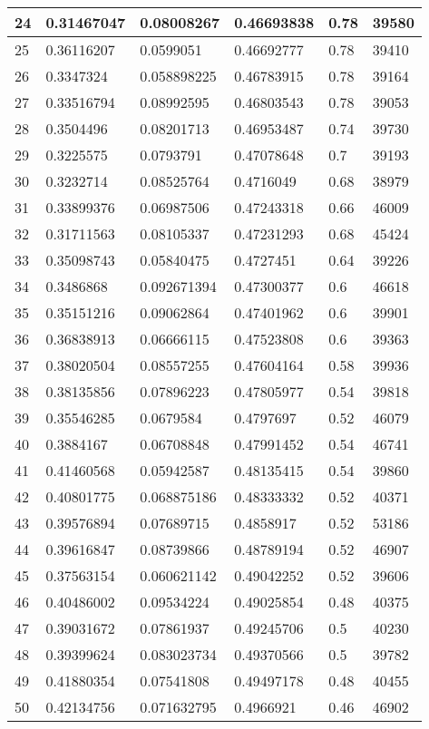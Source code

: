 \begin{longtable}{|l|l|l|l|l|l|}
24 & 0.31467047 & 0.08008267 & 0.46693838 & 0.78 & 39580 \\ \hline 
25 & 0.36116207 & 0.0599051 & 0.46692777 & 0.78 & 39410 \\ \hline 
26 & 0.3347324 & 0.058898225 & 0.46783915 & 0.78 & 39164 \\ \hline 
27 & 0.33516794 & 0.08992595 & 0.46803543 & 0.78 & 39053 \\ \hline 
28 & 0.3504496 & 0.08201713 & 0.46953487 & 0.74 & 39730 \\ \hline 
29 & 0.3225575 & 0.0793791 & 0.47078648 & 0.7 & 39193 \\ \hline 
30 & 0.3232714 & 0.08525764 & 0.4716049 & 0.68 & 38979 \\ \hline 
31 & 0.33899376 & 0.06987506 & 0.47243318 & 0.66 & 46009 \\ \hline 
32 & 0.31711563 & 0.08105337 & 0.47231293 & 0.68 & 45424 \\ \hline 
33 & 0.35098743 & 0.05840475 & 0.4727451 & 0.64 & 39226 \\ \hline 
34 & 0.3486868 & 0.092671394 & 0.47300377 & 0.6 & 46618 \\ \hline 
35 & 0.35151216 & 0.09062864 & 0.47401962 & 0.6 & 39901 \\ \hline 
36 & 0.36838913 & 0.06666115 & 0.47523808 & 0.6 & 39363 \\ \hline 
37 & 0.38020504 & 0.08557255 & 0.47604164 & 0.58 & 39936 \\ \hline 
38 & 0.38135856 & 0.07896223 & 0.47805977 & 0.54 & 39818 \\ \hline 
39 & 0.35546285 & 0.0679584 & 0.4797697 & 0.52 & 46079 \\ \hline 
40 & 0.3884167 & 0.06708848 & 0.47991452 & 0.54 & 46741 \\ \hline 
41 & 0.41460568 & 0.05942587 & 0.48135415 & 0.54 & 39860 \\ \hline 
42 & 0.40801775 & 0.068875186 & 0.48333332 & 0.52 & 40371 \\ \hline 
43 & 0.39576894 & 0.07689715 & 0.4858917 & 0.52 & 53186 \\ \hline 
44 & 0.39616847 & 0.08739866 & 0.48789194 & 0.52 & 46907 \\ \hline 
45 & 0.37563154 & 0.060621142 & 0.49042252 & 0.52 & 39606 \\ \hline 
46 & 0.40486002 & 0.09534224 & 0.49025854 & 0.48 & 40375 \\ \hline 
47 & 0.39031672 & 0.07861937 & 0.49245706 & 0.5 & 40230 \\ \hline 
48 & 0.39399624 & 0.083023734 & 0.49370566 & 0.5 & 39782 \\ \hline 
49 & 0.41880354 & 0.07541808 & 0.49497178 & 0.48 & 40455 \\ \hline 
50 & 0.42134756 & 0.071632795 & 0.4966921 & 0.46 & 46902 \\ \hline 
\end{longtable}